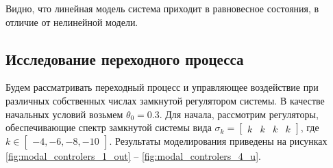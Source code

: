 \FloatBarrier
Видно, что линейная модель система приходит в равновесное состояния, в отличие от нелинейной модели.

\subsection{Исследование переходного процесса}
Будем рассматривать переходный процесс и управляющее воздействие при различных собственных числах замкнутой регулятором системы. 
В качестве начальных условий возьмем $\theta_0 = 0.3$. Для начала, рассмотрим регуляторы, обеспечивающие спектр 
замкнутой системы вида $\sigma_k = \begin{bmatrix}k & k & k & k\end{bmatrix}$, где $k \in \begin{bmatrix}-4, -6, -8, -10\end{bmatrix}$. 
Результаты моделирования приведены на рисунках \ref{fig:modal_controlers_1_out} -- \ref{fig:modal_controlers_4_u}.

